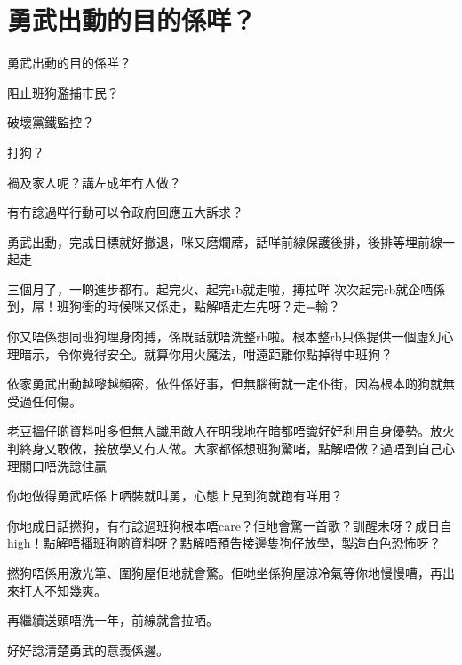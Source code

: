 \chapter{勇武出動的目的係咩？}

勇武出動的目的係咩？

阻止班狗濫捕市民？

破壞黨鐵監控？

打狗？

禍及家人呢？講左成年冇人做？

有冇諗過咩行動可以令政府回應五大訴求？

勇武出動，完成目標就好撤退，咪又磨爛蓆，話咩前線保護後排，後排等埋前線一起走

三個月了，一啲進步都冇。起完火、起完rb就走啦，搏拉咩 次次起完rb就企哂係到，屌！班狗衝的時候咪又係走，點解唔走左先呀？走=輸？

你又唔係想同班狗埋身肉搏，係既話就唔洗整rb啦。根本整rb只係提供一個虛幻心理暗示，令你覺得安全。就算你用火魔法，咁遠距離你點掉得中班狗？

依家勇武出動越嚟越頻密，依件係好事，但無腦衝就一定仆街，因為根本啲狗就無受過任何傷。

老豆搵仔啲資料咁多但無人識用敵人在明我地在暗都唔識好好利用自身優勢。放火判終身又敢做，接放學又冇人做。大家都係想班狗驚啫，點解唔做？過唔到自己心理關口唔洗諗住贏

你地做得勇武唔係上哂裝就叫勇，心態上見到狗就跑有咩用？

你地成日話撚狗，有冇諗過班狗根本唔care？佢地會驚一首歌？訓醒未呀？成日自high！點解唔播班狗啲資料呀？點解唔預告接邊隻狗仔放學，製造白色恐怖呀？

撚狗唔係用激光筆、圍狗屋佢地就會驚。佢哋坐係狗屋涼冷氣等你地慢慢嘈，再出來打人不知幾爽。

再繼續送頭唔洗一年，前線就會拉哂。

好好諗清楚勇武的意義係邊。

